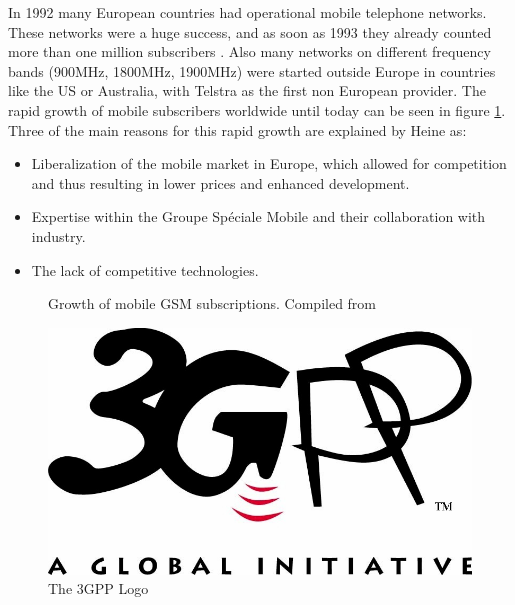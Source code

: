 In 1992 many European countries had operational mobile telephone networks.
These networks were a huge success, and as soon as 1993 they already counted more than one million subscribers \cite{GSM2009}.
Also many networks on different frequency bands (900MHz, 1800MHz, 1900MHz) were started outside Europe in countries like the US or Australia, with Telstra as the first non European provider.
The rapid growth of mobile subscribers worldwide until today can be seen in figure \ref{fig:gsm_growth}.
Three of the main reasons for this rapid growth are explained by Heine \cite{protocols1999} as:
\begin{itemize}
	\item Liberalization of the mobile market in Europe, which allowed for competition and thus resulting in lower prices and enhanced development.
	\item Expertise within the Groupe Sp\'{e}ciale Mobile and their collaboration with industry.
	\item The lack of competitive technologies.
\end{itemize}

\begin{figure}
\centering
{}
\caption{Growth of mobile GSM subscriptions. Compiled from \cite{GSM2009,GSM_history2011,GSM_stats2011}}
\label{fig:gsm_growth}
\end{figure}

\begin{figure}
\centering
\includegraphics[width=.5\textwidth]{../Images/3gpp.jpg}
\caption{The 3GPP Logo}
\end{figure}


